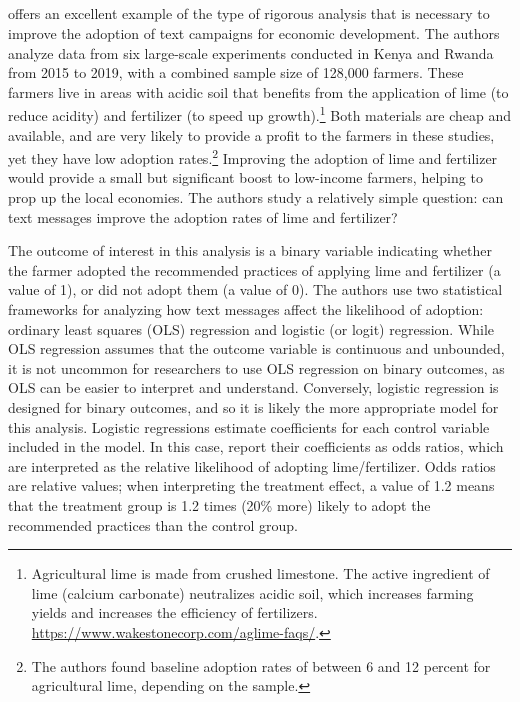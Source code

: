 \documentclass[12pt]{article}
\begin{document}
\subsection{\textcite{fabregas_digital_2025}}
\textcite{fabregas_digital_2025} offers an excellent example of the type of rigorous analysis that is necessary to improve the adoption of text campaigns for economic development. The authors analyze data from six large-scale experiments conducted in Kenya and Rwanda from 2015 to 2019, with a combined sample size of 128,000 farmers. These farmers live in areas with acidic soil that benefits from the application of lime (to reduce acidity) and fertilizer (to speed up growth).\footnote{Agricultural lime is made from crushed limestone. The active ingredient of lime (calcium carbonate) neutralizes acidic soil, which increases farming yields and increases the efficiency of fertilizers. \url{https://www.wakestonecorp.com/aglime-faqs/}.} Both materials are cheap and available, and are very likely to provide a profit to the farmers in these studies, yet they have low adoption rates.\footnote{The authors found baseline adoption rates of between 6 and 12 percent for agricultural lime, depending on the sample.} Improving the adoption of lime and fertilizer would provide a small but significant boost to low-income farmers, helping to prop up the local economies. The authors study a relatively simple question: can text messages improve the adoption rates of lime and fertilizer?

The outcome of interest in this analysis is a binary variable indicating whether the farmer adopted the recommended practices of applying lime and fertilizer (a value of 1), or did not adopt them (a value of 0). The authors use two statistical frameworks for analyzing how text messages affect the likelihood of adoption: ordinary least squares (OLS) regression and logistic (or logit) regression. While OLS regression assumes that the outcome variable is continuous and unbounded, it is not uncommon for researchers to use OLS regression on binary outcomes, as OLS can be easier to interpret and understand. Conversely, logistic regression is designed for binary outcomes, and so it is likely the more appropriate model for this analysis. Logistic regressions estimate coefficients for each control variable included in the model. In this case, \textcite{fabregas_digital_2025} report their coefficients as odds ratios, which are interpreted as the relative likelihood of adopting lime/fertilizer. Odds ratios are relative values; when interpreting the treatment effect, a value of 1.2 means that the treatment group is 1.2 times (20\% more) likely to adopt the recommended practices than the control group.
\end{document}
